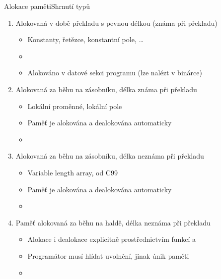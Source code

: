 \begin{frame}{Alokace paměti}{Shrnutí typů}

  \begin{enumerate}
    \item Alokovaná v době překladu s pevnou délkou (známa při překladu)
    \begin{itemize}
      \item Konstanty, řetězce, konstantní pole, \dots
      \item {}
      \item Alokováno v datové sekci programu (lze nalézt v binárce)
    \end{itemize}

    \pause

    \item Alokovaná za běhu na zásobníku, délka známa při překladu
    \begin{itemize}
      \item Lokální proměnné, lokální pole
      \item Paměť je alokována a dealokována automaticky
      \item {}
    \end{itemize}

    \pause

    \item Alokovaná za běhu na zásobníku, délka neznáma při překladu
    \begin{itemize}
      \item Variable length array, od C99
      \item Paměť je alokována a dealokována automaticky
      \item {}
    \end{itemize}

    \pause

    \item Paměť alokovaná za běhu na haldě, délka neznáma při překladu
    \begin{itemize}
      \item Alokace i dealokace explicitně prostřednictvím funkcí 
	a 
      \item Programátor musí hlídat uvolnění, jinak únik paměti
      \item {}
    \end{itemize}

  \end{enumerate}

\end{frame}

